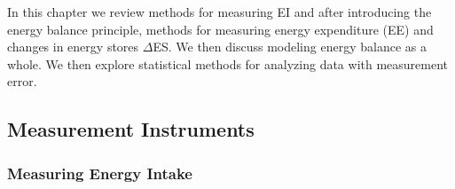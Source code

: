 \documentclass[11pt]{article}\usepackage[]{graphicx}\usepackage[]{color}
\begin{document}
In this chapter we review methods for measuring EI and after introducing the energy balance principle, methods for measuring energy expenditure (EE) and changes in energy stores $\Delta$ES. We then discuss modeling energy balance as a whole. We then explore statistical methods for analyzing data with measurement error. \\

\subsection{Measurement Instruments}

\subsubsection{Measuring Energy Intake}
\end{document}
